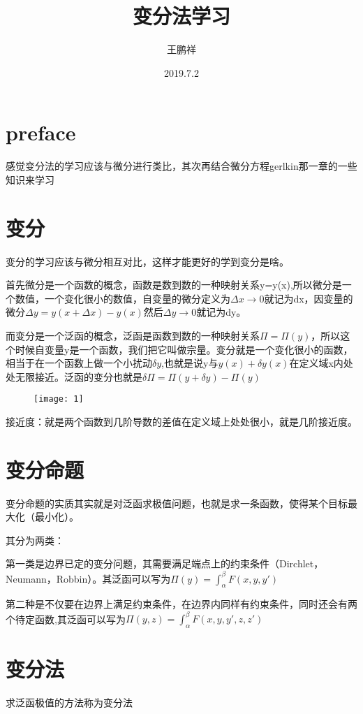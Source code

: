 \documentclass{article}
\begin{document}
\title{变分法学习}
\author{王鹏祥}
\date{2019.7.2}
\maketitle
\tableofcontents
\newpage
		\section{preface}
		感觉变分法的学习应该与微分进行类比，其次再结合微分方程gerlkin那一章的一些知识来学习
		\section{变分}\setlength{\parindent}{2em}
		变分的学习应该与微分相互对比，这样才能更好的学到变分是啥。
		
	    首先微分是一个函数的概念，函数是数到数的一种映射关系y=y(x),所以微分是一个数值，一个变化很小的数值，自变量的微分定义为$\Delta x\rightarrow0$就记为dx，因变量的微分$\Delta y =y(x+\Delta x)-y(x) $然后$\Delta y\rightarrow0 $就记为dy。
	    
	   而变分是一个泛函的概念，泛函是函数到数的一种映射关系$\varPi=\varPi(y)$，所以这个时候自变量y是一个函数，我们把它叫做宗量。变分就是一个变化很小的函数，相当于在一个函数上做一个小扰动$ \delta y$,也就是说y与$y(x)+\delta y(x)$在定义域x内处处无限接近。泛函的变分也就是$ \delta\varPi=\varPi(y+\delta y)-\varPi(y)$
  	   
\begin{figure}[H]
	\centering
	\texttt{[image: 1]}
	\caption{}
	\label{fig:1}
\end{figure}
	    
		接近度：就是两个函数到几阶导数的差值在定义域上处处很小，就是几阶接近度。

		\section{变分命题}
		变分命题的实质其实就是对泛函求极值问题，也就是求一条函数，使得某个目标最大化（最小化）。
	
	    其分为两类：
	    
	    第一类是边界已定的变分问题，其需要满足端点上的约束条件（Dirchlet，Neumann，Robbin）。其泛函可以写为$\varPi(y)=\int_{\alpha}^{\beta} F(x,y,y')$	    
	    
	    第二种是不仅要在边界上满足约束条件，在边界内同样有约束条件，同时还会有两个待定函数,其泛函可以写为$\varPi(y,z)=\int_{\alpha}^{\beta} F(x,y,y',z,z')$	
	    
		\section{变分法}
	    求泛函极值的方法称为变分法
	    
\end{document}
